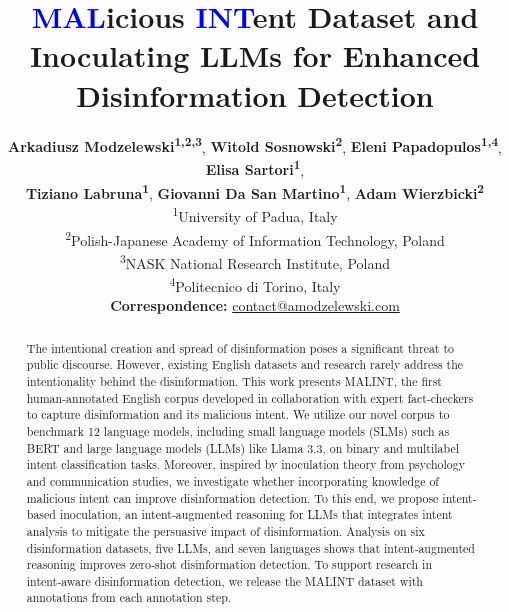 \documentclass[11pt]{article}
\title{\textcolor{blue}{MAL}icious \textcolor{blue}{INT}ent Dataset and Inoculating LLMs for Enhanced Disinformation Detection}
\author{
 \textbf{Arkadiusz Modzelewski\textsuperscript{1,2,3}}, 
 \textbf{Witold Sosnowski\textsuperscript{2}},
 \textbf{Eleni Papadopulos\textsuperscript{1,4}},
 \textbf{Elisa Sartori\textsuperscript{1}},\\
 \textbf{Tiziano Labruna\textsuperscript{1}},
 \textbf{Giovanni Da San Martino\textsuperscript{1}},
 \textbf{Adam Wierzbicki\textsuperscript{2}}
 \vspace{0.2cm}
\\
 \textsuperscript{1}University of Padua, Italy \\
 \textsuperscript{2}Polish-Japanese Academy of Information Technology, Poland \\
 \textsuperscript{3}NASK National Research Institute, Poland \\
 \textsuperscript{4}{Politecnico di Torino}, Italy \\
 \small{
   \textbf{Correspondence:} \href{mailto:contact@amodzelewski.com}{contact@amodzelewski.com}
 }
}
\begin{document}
\maketitle
\begin{abstract}



The intentional creation and spread of disinformation poses a significant threat to public discourse. However, existing English datasets and research rarely address the intentionality behind the disinformation. This work presents MALINT, the first human-annotated English corpus developed in collaboration with expert fact-checkers to capture disinformation and its malicious intent. We utilize our novel corpus to benchmark 12 language models, including small language models (SLMs) such as BERT and large language models (LLMs) like Llama 3.3, on binary and multilabel intent classification tasks. Moreover, inspired by inoculation theory from psychology and communication studies, we investigate whether incorporating knowledge of malicious intent can improve disinformation detection. To this end, we propose intent-based inoculation, an intent‑augmented reasoning for LLMs that integrates intent analysis to mitigate the persuasive impact of disinformation. Analysis on six disinformation datasets, five LLMs, and seven languages shows that intent‑augmented reasoning improves zero‑shot disinformation detection. To support research in intent‑aware disinformation detection, we release the MALINT dataset with annotations from each annotation step.

\end{abstract}
\end{document}
